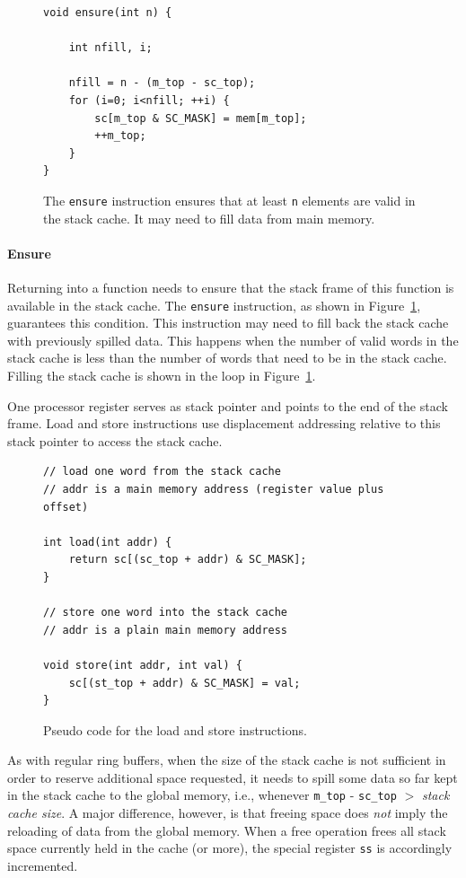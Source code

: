 \documentclass[a4paper,fontsize=10pt,twoside,DIV15,BCOR12mm,headinclude=true,footinclude=false,pagesize,bibtotoc]{scrbook}
\newcommand{\code}[1]{{\texttt{#1}}}
\newcommand{\comment}[3]{

\textsf{\textbf{#1}} {\color{#3}#2}}
\newcommand{\martin}[1]{\comment{Martin}{#1}{Blue}}
\renewcommand{\martin}[1]{}
\begin{document}
\begin{figure}
\begin{lstlisting}
void ensure(int n) {

    int nfill, i;

    nfill = n - (m_top - sc_top);
    for (i=0; i<nfill; ++i) {
        sc[m_top & SC_MASK] = mem[m_top];
        ++m_top;
    }
}
\end{lstlisting}
	\caption{The \code{ensure} instruction ensures that
	at least \code{n} elements are valid in the stack cache.
	It may need to fill data from main memory.}
 	\label{fig:ens_iml}
\end{figure}

\paragraph{Ensure} Returning into a function needs to ensure that the stack
frame of this function is available in the stack cache. The \code{ensure} instruction,
as shown in Figure~\ref{fig:ens_iml}, guarantees this condition.
This instruction may need to fill back the stack cache with previously spilled data.
This happens when the number of valid words in the stack cache is less than the
number of words that need to be in the stack cache.
Filling the stack cache is shown in the loop in Figure~\ref{fig:ens_iml}.

One processor register serves as stack pointer and points to the end of the stack frame.
Load and store instructions use displacement addressing relative to this stack pointer
to access the stack cache.

\begin{figure}
\begin{lstlisting}
// load one word from the stack cache
// addr is a main memory address (register value plus offset)

int load(int addr) {
    return sc[(sc_top + addr) & SC_MASK];
}

// store one word into the stack cache
// addr is a plain main memory address

void store(int addr, int val) {
    sc[(st_top + addr) & SC_MASK] = val;
}
\end{lstlisting}
	\caption{Pseudo code for the load and store instructions.}
 	\label{fig:ld_st_iml}
\end{figure}

\martin{We might update this section with more content from the S\$ paper}

As with regular ring buffers, when the size of the stack cache is not sufficient
in order to reserve additional space requested, it needs to spill some data
so far kept in the stack cache to the global memory, i.e., whenever
\code{m\_top} - \code{sc\_top} $>$ \emph{stack cache size}. A major difference,
however, is that freeing space does \emph{not} imply the reloading of data from
the global memory. When a free operation frees all stack space currently held in
the cache (or more), the special register \texttt{ss} is accordingly
incremented.
\end{document}
